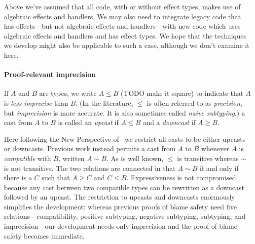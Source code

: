 Above we've assumed that all code, with or without effect types,
makes use of algebraic effects and handlers.
We may also need to integrate legacy code that has effects---but
not algebraic effects and handlers---with new code which uses algebraic effects
and handlers and has effect types.
We hope that the techniques we develop might also be applicable to such a case,
although we don't examine it here.

\newcommand{\imp}{\le}
\newcommand{\pmi}{\ge}
\newcommand{\comp}{\sim}

\paragraph{Proof-relevant imprecision}
If $A$ and $B$ are types, we write $A \imp B$ (TODO make it square)
to indicate that $A$ is \emph{less imprecise} than $B$. (In the literature,
$\imp$ is often referred to as \emph{precision}, but \emph{imprecision} is more
accurate. It is also sometimes called \emph{naive subtyping}.)
a cast from $A$ to $B$ is called an \emph{upcast} if $A \imp B$
and a \emph{downcast} if $A \pmi B$.

Here following the New Perspective of~\citet{castagna-et-al-TODO} we restrict
all casts to be either upcasts or downcasts. Previous work instead permits
a cast from $A$ to $B$ whenever $A$ is \emph{compatible} with $B$,
written $A \comp B$. As is well known, $\imp$ is transitive whereas $\comp$
is not transitive. The two relations are connected in that $A \comp B$
if and only if there is a $C$ such that $A \pmi C$ and $C \imp B$.
Expressiveness is not compromised because any cast between
two compatible types can be rewritten as a downcast followed by an upcast.
The restriction to upcasts and downcasts enormously simplifies the
development: whereas previous proofs of blame safety need five
relations---compatibility, positive subtyping, negative subtyping,
subtyping, and imprecision---our development needs only imprecision
and the proof of blame safety becomes immediate.

\newcommand{\id}{\mathtt{id}}

